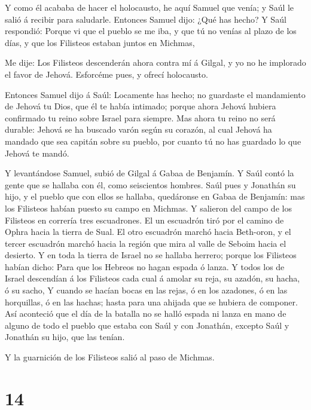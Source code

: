  Y como él acababa de hacer el holocausto, he aquí Samuel
que venía; y Saúl le salió á recibir para saludarle. 
Entonces Samuel dijo: ¿Qué has hecho? Y Saúl respondió: Porque vi que el
pueblo se me iba, y que tú no venías al plazo de los días, y que los
Filisteos estaban juntos en Michmas,

 Me dije: Los Filisteos descenderán ahora contra mí á
Gilgal, y yo no he implorado el favor de Jehová. Esforcéme pues, y
ofrecí holocausto.

 Entonces Samuel dijo á Saúl: Locamente has hecho; no
guardaste el mandamiento de Jehová tu Dios, que él te había intimado;
porque ahora Jehová hubiera confirmado tu reino sobre Israel para
siempre.  Mas ahora tu reino no será durable: Jehová se ha
buscado varón según su corazón, al cual Jehová ha mandado que sea
capitán sobre su pueblo, por cuanto tú no has guardado lo que Jehová te
mandó.

 Y levantándose Samuel, subió de Gilgal á Gabaa de
Benjamín. Y Saúl contó la gente que se hallaba con él, como seiscientos
hombres.  Saúl pues y Jonathán su hijo, y el pueblo que con
ellos se hallaba, quedáronse en Gabaa de Benjamín: mas los Filisteos
habían puesto su campo en Michmas.  Y salieron del campo de
los Filisteos en correría tres escuadrones. El un escuadrón tiró por el
camino de Ophra hacia la tierra de Sual.  El otro escuadrón
marchó hacia Beth-oron, y el tercer escuadrón marchó hacia la región que
mira al valle de Seboim hacia el desierto.  Y en toda la
tierra de Israel no se hallaba herrero; porque los Filisteos habían
dicho: Para que los Hebreos no hagan espada ó lanza.  Y
todos los de Israel descendían á los Filisteos cada cual á amolar su
reja, su azadón, su hacha, ó su sacho,  Y cuando se hacían
bocas en las rejas, ó en los azadones, ó en las horquillas, ó en las
hachas; hasta para una ahijada que se hubiera de componer. 
Así aconteció que el día de la batalla no se halló espada ni lanza en
mano de alguno de todo el pueblo que estaba con Saúl y con Jonathán,
excepto Saúl y Jonathán su hijo, que las tenían.

 Y la guarnición de los Filisteos salió al paso de Michmas.

\hypertarget{section-13}{%
\section{14}\label{section-13}}

